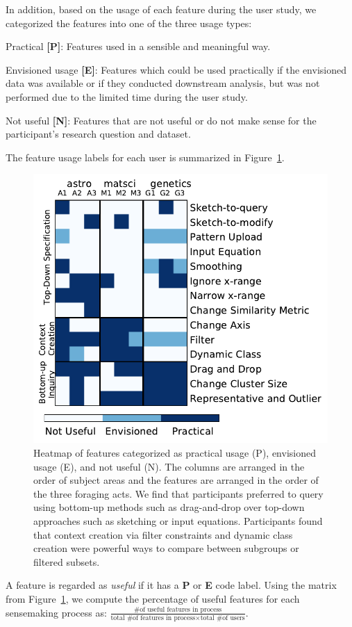 \npar In addition, based on the usage of each feature during the user study, we categorized the features into one of the three usage types:
\begin{denselist}
    \item Practical \textbf{[P]}: Features used in a sensible and meaningful way.
    \item Envisioned usage \textbf{[E]}: Features which could be used practically if the envisioned data was available or if they conducted downstream analysis, but was not performed due to the limited time during the user study.
    \item Not useful \textbf{[N]}: Features that are not useful or do not make sense for the participant's research question and dataset.
\end{denselist}
The feature usage labels for each user is summarized in Figure~\ref{feature_heatmap}.
\begin{figure}[h!]
    \centering
    \includegraphics[width=0.75\columnwidth]{figures/PENcoding.pdf}
    \vspace{-6pt}\caption{Heatmap of features categorized as practical usage (P), envisioned usage (E), and not useful (N). The columns are arranged in the order of subject areas and the features are arranged in the order of the three foraging acts. We find that participants preferred to query using bottom-up methods such as drag-and-drop over top-down approaches such as sketching or input equations. Participants found that context creation via filter constraints and dynamic class creation were powerful ways to compare between subgroups or filtered subsets.}
    \label{feature_heatmap}
    \vspace{-5pt}
\end{figure}
A feature is regarded as \emph{useful} if it has a \textbf{P} or \textbf{E} code label. Using the matrix from Figure~\ref{feature_heatmap}, we compute the percentage of useful features for each sensemaking process as: $\frac{\textrm{\# of useful features in process}}{\textrm{total \# of features in process} \times \textrm{total \# of users}}$.
